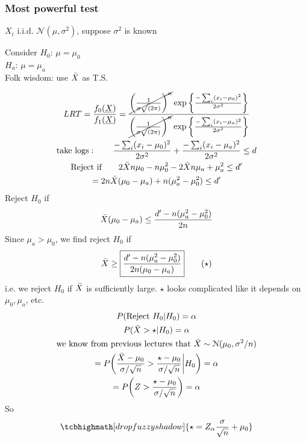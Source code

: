 \subsubsection*{Most powerful test}
\begin{example-N}
	$X_i$ i.i.d. $\mathcal{N}(\mu, \sigma^2)$, suppose $\sigma^2$ is known
	\begin{center}
		Consider $H_0$: $\mu = \mu_0$\\
		\qquad $H_a$: $\mu = \mu_a$\\
		Folk wisdom: use $\bar{X}$ as T.S.
	\end{center}
	\begin{gather*}
		LRT = \frac{f_0(\underline{X})}{f_1(\underline{X})} = \frac{\cancel{\bigg( \frac{1}{\sigma\sqrt(2\pi)} \bigg)^n} \exp \bigg\{ \frac{-\sum_i (x_i - \mu_0)^2}{2\sigma^2} \bigg\} }{\cancel{\bigg( \frac{1}{\sigma\sqrt(2\pi)} \bigg)^n} \exp \bigg\{ \frac{-\sum_i (x_i - \mu_a)^2}{2\sigma^2} \bigg\} }\\
		\text{take logs}: \qquad \frac{-\sum_i (x_i - \mu_0)^2}{2\sigma^2} + \frac{-\sum_i (x_i - \mu_a)^2}{2\sigma^2}  \leq d\\
		\text{Reject if} \qquad 2\bar{X} n \mu_0 - n \mu_0^2 - 2\bar{X} n \mu_a + \mu_a^2 \leq d'\\
		= 2n\bar{X} (\mu_0 - \mu_a) + n (\mu_a^2 - \mu_0^2) \leq d'
	\end{gather*}
	Reject $H_0$ if 
	\begin{gather*}
		\bar{X} (\mu_0 - \mu_a) \leq \frac{d' - n(\mu_a^2 - \mu_0^2)}{2n}
	\end{gather*}
	Since $\mu_a > \mu_0$, we find reject $H_0$ if 
	\begin{gather*}
		\bar{X} \geq \boxed{\frac{d' - n(\mu_a^2 - \mu_0^2)}{2n(\mu_0 - \mu_a)}} \tag{$\star$}
	\end{gather*}
	i.e. we reject $H_0$ if $\bar{X}$ is sufficiently large. $\star$ looks complicated like it depends on $\mu_0, \mu_a$, etc.
	\begin{gather*}
		P(\text{Reject } H_0 | H_0) = \alpha\\
		P(\bar{X} > \star | H_0) = \alpha\\
		\text{we know from previous lectures that } \bar{X} \sim \mathcal{N}(\mu_0, \sigma^2 / n)\\
		= P \bigg(\frac{\bar{X} - \mu_0}{\sigma / \sqrt{n}} > \frac{\star - \mu_0}{\sigma / \sqrt{n}} \bigg| H_0 \bigg) = \alpha \\
		= P \bigg(Z > \frac{\star - \mu_0}{\sigma / \sqrt{n}} \bigg) = \alpha
	\end{gather*}
	So
	\begin{gather*}
		\tcbhighmath[drop fuzzy shadow]{\star = Z_\alpha \frac{\sigma}{\sqrt{n}} + \mu_0}
	\end{gather*}
\end{example-N}
